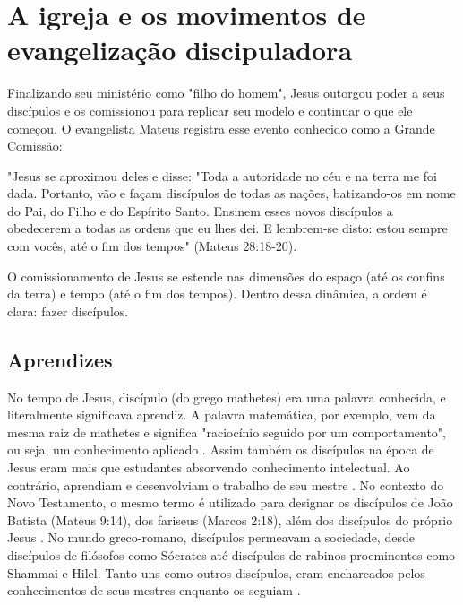\documentclass[12pt,openright,oneside,a4paper]{abntex2}
\begin{document}
\section{A igreja e os movimentos de evangelização discipuladora}

Finalizando seu ministério como "filho do homem", Jesus outorgou poder a seus discípulos e os comissionou para replicar seu modelo e continuar o que ele começou. O evangelista Mateus registra esse evento conhecido como a Grande Comissão: 

\begin{citacao}
"Jesus se aproximou deles e disse: "Toda a autoridade no céu e na terra me foi dada. Portanto, vão e façam discípulos de todas as nações, batizando-os em nome do Pai, do Filho e do Espírito Santo. Ensinem esses novos discípulos a obedecerem a todas as ordens que eu lhes dei. E lembrem-se disto: estou sempre com vocês, até o fim dos tempos" (Mateus 28:18-20).
\end{citacao}

O comissionamento de Jesus se estende nas dimensões do espaço (até os confins da terra) e tempo (até o fim dos tempos). Dentro dessa dinâmica, a ordem é clara: fazer discípulos.  

\subsection{Aprendizes} 

No tempo de Jesus, discípulo (do grego mathetes) era uma palavra conhecida, e literalmente significava aprendiz. A palavra matemática, por exemplo, vem da mesma raiz de mathetes e significa "raciocínio seguido por um comportamento", ou seja, um conhecimento aplicado \cite[p. 15]{gtsm}. Assim também os discípulos na época de Jesus eram mais que estudantes absorvendo conhecimento intelectual. Ao contrário, aprendiam e desenvolviam o trabalho de seu mestre \cite[p. 15]{gtsm}. No contexto do Novo Testamento, o mesmo termo é utilizado para designar os discípulos de João Batista (Mateus 9:14), dos fariseus (Marcos 2:18), além dos discípulos do próprio Jesus \cite[p. 59]{brandao}. No mundo greco-romano, discípulos permeavam a sociedade, desde discípulos de filósofos como Sócrates até discípulos de rabinos proeminentes como Shammai e Hilel. Tanto uns como outros discípulos, eram encharcados pelos conhecimentos de seus mestres enquanto os seguiam \cite[p. 209]{shirley}.
\end{document}
